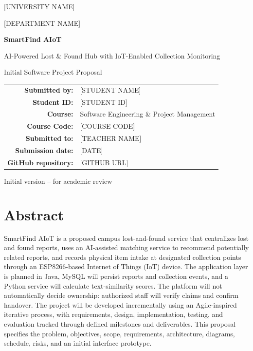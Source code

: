 \documentclass[12pt,a4paper]{report}
\begin{document}
\begin{titlepage}
\centering
\vspace*{1.2cm}
{\Large [UNIVERSITY NAME]\par}
\vspace{0.3cm}
{\large [DEPARTMENT NAME]\par}
\vspace{1.8cm}
{\Huge\bfseries SmartFind AIoT\par}
\vspace{0.4cm}
{\Large AI-Powered Lost \& Found Hub with IoT-Enabled Collection Monitoring\par}
\vspace{1.5cm}
{\large Initial Software Project Proposal\par}
\vfill
\begin{tabular}{rl}
\textbf{Submitted by:} & [STUDENT NAME]\\
\textbf{Student ID:} & [STUDENT ID]\\
\textbf{Course:} & Software Engineering \& Project Management\\
\textbf{Course Code:} & [COURSE CODE]\\
\textbf{Submitted to:} & [TEACHER NAME]\\
\textbf{Submission date:} & [DATE]\\
\textbf{GitHub repository:} & [GITHUB URL]\\
\end{tabular}
\vfill
{\large Initial version -- for academic review\par}
\end{titlepage}

\chapter*{Abstract}
SmartFind AIoT is a proposed campus lost-and-found service that centralizes lost and found reports, uses an AI-assisted matching service to recommend potentially related reports, and records physical item intake at designated collection points through an ESP8266-based Internet of Things (IoT) device. The application layer is planned in Java, MySQL will persist reports and collection events, and a Python service will calculate text-similarity scores. The platform will not automatically decide ownership: authorized staff will verify claims and confirm handover. The project will be developed incrementally using an Agile-inspired iterative process, with requirements, design, implementation, testing, and evaluation tracked through defined milestones and deliverables. This proposal specifies the problem, objectives, scope, requirements, architecture, diagrams, schedule, risks, and an initial interface prototype.
\end{document}
